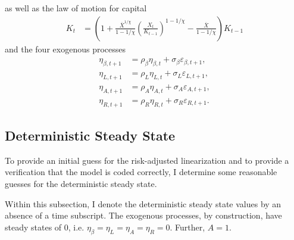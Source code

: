 \documentclass[12 pt, oneside]{article}
\theoremstyle{definition}
\theoremstyle{definition}
\theoremstyle{definition}
\begin{document}
as well as the law of motion for capital
\begin{align}\label{eq:law of motion capital eqm}
  K_t & = \left(1 + \frac{\overline{X}^{1/\chi}}{1 - 1/\chi}\left(\frac{X_t}{K_{t - 1}}\right)^{1 - 1/\chi} - \frac{\overline{X}}{1 - 1 / \chi}\right)K_{t - 1}
\end{align}
and the four exogenous processes
\begin{align}
  \label{eq:ar1 beta}
  \eta_{\beta, t + 1} & = \rho_\beta\eta_{\beta, t} + \sigma_\beta \varepsilon_{\beta, t + 1},\\
  \eta_{L, t + 1} & = \rho_L\eta_{L, t} + \sigma_L \varepsilon_{L, t + 1},\\
  \eta_{A, t + 1} & = \rho_A\eta_{A, t} + \sigma_A \varepsilon_{A, t + 1},\\
  \label{eq:ar1 R}
  \eta_{R, t + 1} & = \rho_R\eta_{R, t} + \sigma_R \varepsilon_{R, t + 1}.
\end{align}

\subsection{Deterministic Steady State}
To provide an initial guess for the risk-adjusted linearization and to provide a verification that the model is coded correctly, I determine some reasonable guesses for the deterministic steady state.

Within this subsection, I denote the deterministic steady state values by an absence of a time subscript. The exogenous processes, by construction, have steady states of 0, i.e. $\eta_\beta = \eta_L = \eta_A = \eta_R = 0$. Further, $A = 1$.
\end{document}
